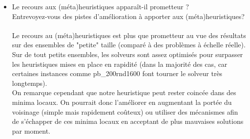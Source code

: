 \documentclass[ a4paper,10pt]{article}
\begin{document}
\begin{itemize}
\newpage

\item Le recours aux (méta)heuristiques apparaît-il prometteur ? \\
Entrevoyez-vous des pistes d'amélioration à apporter 
aux (méta)heuristiques? \\ \\
Le recours au (méta)heuristiques est plus que prometteur au vue des résultats sur des ensembles de "petite" taille (comparé à des problèmes à échelle réelle). 
Sur de tout petits ensembles, les solveurs sont assez optimisés pour surpasser les heuristiques mises en place en rapidité (dans la majorité des cas, car certaines instances comme pb\_200rnd1600 font tourner le solveur très longtemps). \\
On remarque cependant que notre heuristique peut rester coincée dans des minima locaux. On pourrait donc l'améliorer en augmentant la portée du voisinage (simple mais rapidement coûteux) ou utiliser des mécanismes afin de s'échapper de ces minima locaux en acceptant de plus mauvaises solutions par moment.
\end{itemize}
\end{document}

